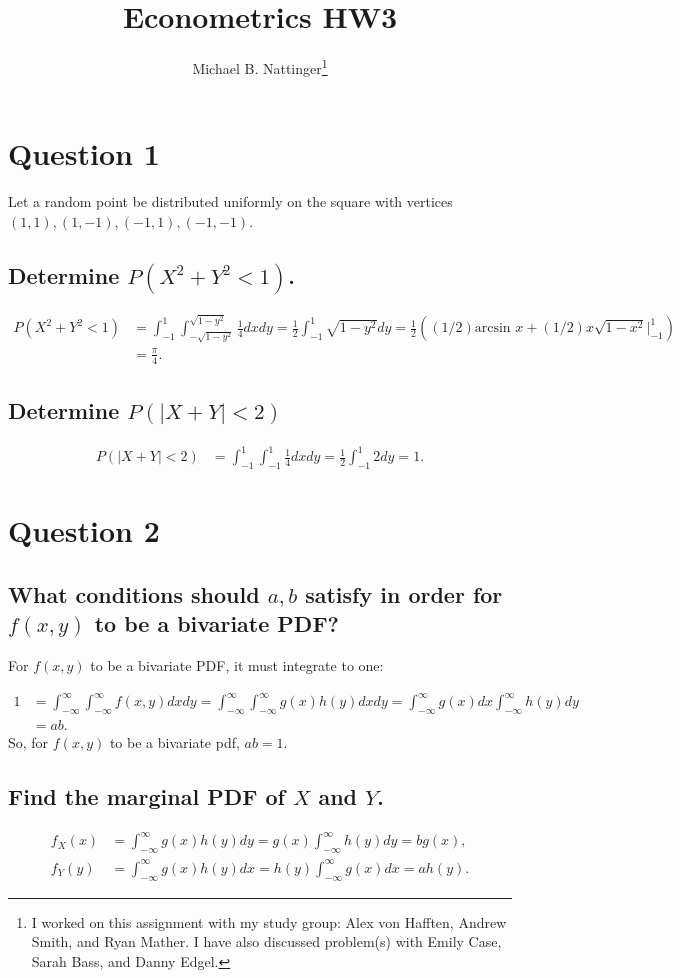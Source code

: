 \documentclass[11pt]{article} %
\title{Econometrics HW3}
\author{Michael B. Nattinger\footnote{I worked on this assignment with my study group: Alex von Hafften, Andrew Smith, and Ryan Mather. I have also discussed problem(s) with Emily Case, Sarah Bass, and Danny Edgel.}}
\begin{document}
\maketitle

\section{Question 1}
Let a random point be distributed uniformly on the square with vertices $(1,1),(1,-1),(-1,1),(-1,-1)$.
\subsection{Determine $P(X^2+Y^2<1)$.}
\begin{align*}
P(X^2+Y^2<1) &= \int_{-1}^{1}\int_{-\sqrt{1-y^2}}^{\sqrt{1-y^2}}\frac{1}{4}dxdy = \frac{1}{2}\int_{-1}^{1} \sqrt{1 - y^2 }dy = \frac{1}{2}((1/2)\text{arcsin }x  + (1/2)x\sqrt{1 - x^2}|_{-1}^{1}) \\
&= \frac{\pi}{4}.
\end{align*}
\subsection{Determine $P(|X+Y|<2)$}
\begin{align*}
P(|X+Y|<2) &= \int_{-1}^{1}\int_{-1}^{1}\frac{1}{4}dxdy = \frac{1}{2}\int_{-1}^{1}2dy =  1.
\end{align*}
\section{Question 2}
\subsection{What conditions should $a,b$ satisfy in order for $f(x,y)$ to be a bivariate PDF?}
For $f(x,y)$ to be a bivariate PDF, it must integrate to one:

\begin{align*}
1 &= \int_{-\infty}^{\infty} \int_{-\infty}^{\infty} f(x,y) dxdy = \int_{-\infty}^{\infty}\int_{-\infty}^{\infty}g(x)h(y)dxdy = \int_{-\infty}^{\infty}g(x)dx\int_{-\infty}^{\infty}h(y)dy \\ &= ab.
\end{align*}
So, for $f(x,y)$ to be a bivariate pdf, $ab =1.$
\subsection{Find the marginal PDF of $X$ and $Y$.}
\begin{align*}
f_X(x) &= \int_{-\infty}^{\infty}g(x)h(y) dy = g(x)\int_{-\infty}^{\infty}h(y) dy = b g(x),\\
f_Y(y) &= \int_{-\infty}^{\infty}g(x)h(y) dx = h(y)\int_{-\infty}^{\infty}g(x) dx = a h(y).
\end{align*}
\end{document}
